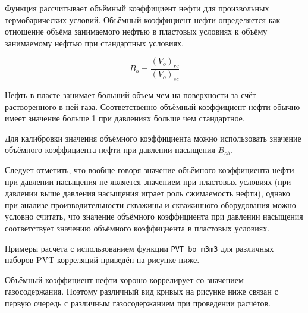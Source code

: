 Функция рассчитывает объёмный коэффициент нефти для произвольных термобарических условий. 
Объёмный коэффициент нефти определяется как отношение объёма занимаемого нефтью в пластовых условиях к объёму занимаемому нефтью при стандартных условиях. 

$$B_o = \frac{(V_o)_{rc}}{(V_o)_{sc}}$$

Нефть в пласте занимает больший объем чем на поверхности за счёт растворенного в ней газа. Соответственно объёмный коэффициент нефти обычно имеет значение больше 1 при давлениях больше чем стандартное.

Для калибровки значения объёмного коэффициента можно использовать значение объёмного коэффициента нефти при давлении насыщения $B_{ob}$. 

Следует отметить, что вообще говоря значение объёмного коэффициента нефти при давлении насыщения не является значением при пластовых условиях (при давлении выше давления насыщения играет роль сжимаемость нефти), однако при анализе производительности скважины и скважинного оборудования можно условно считать, что значение объёмного коэффициента при давлении насыщения соответствует значению  объёмного коэффициента в пластовых условиях.  


Примеры расчёта с использованием функции \texttt{PVT_bo_m3m3} для различных наборов PVT корреляций приведён на рисунке ниже.

Объёмный коэффициент нефти хорошо коррелирует со значением газосодержания. Поэтому различный вид кривых на рисунке ниже связан с первую очередь с различным газосодержанием при проведении расчётов.

\newcommand{\BoDataFile}{data/Bo_P_data.txt}

